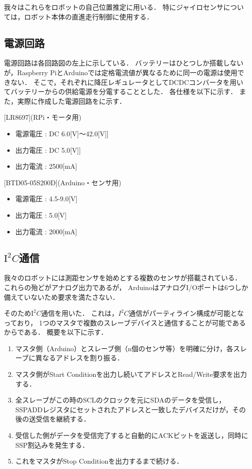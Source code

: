 \documentclass[11pt,a4]{jsarticle}
\begin{document}
      我々はこれらをロボットの自己位置推定に用いる．
      特にジャイロセンサについては，ロボット本体の直進走行制御に使用する．


  \subsection{電源回路}
    電源回路は各回路図の左上に示している．
    バッテリーはひとつしか搭載しないが，Raspberry PiとArduinoでは定格電流値が異なるために同一の電源は使用できない．
    そこで，それぞれに降圧レギュレータとしてDCDCコンバータを用いてバッテリーからの供給電源を分電することとした．
    各仕様を以下に示す．
    また，実際に作成した電源回路をに示す．

    [LR8697](RPi・モータ用)
    \begin{itemize}
     \item 電源電圧 : DC 6.0[V]$〜$42.0[V]]
     \item 出力電圧 : DC 5.0[V]]
     \item 出力電流 : 2500[mA]
    \end{itemize}

    [BTD05-05S200D](Arduino・センサ用)
    \begin{itemize}
     \item 電源電圧 : 4.5-9.0[V]
     \item 出力電圧 : 5.0[V]
     \item 出力電流 : 2000[mA]
    \end{itemize}


  \subsection{$\mathrm{I^2}C$通信}
    我々のロボットには測距センサを始めとする複数のセンサが搭載されている．
    これらの殆どがアナログ出力であるが，
    ArduinoはアナログI/Oポートは6つしか備えていないため要求を満たさない．

    そのため$\mathrm{I^2}C$通信を用いた．
    これは，$I^2 C$通信がパーティライン構成が可能となっており，
    1つのマスタで複数のスレーブデバイスと通信することが可能であるからである．
    概要を以下に示す．
    \begin{enumerate}
      \item マスタ側（Arduino）とスレーブ側（n個のセンサ等）を明確に分け，各スレーブに異なるアドレスを割り振る．
      \item マスタ側がStart Conditionを出力し続いてアドレスとRead/Write要求を出力する．
      \item 全スレーブがこの時のSCLのクロックを元にSDAのデータを受信し，SSPADDレジスタにセットされたアドレスと一致したデバイスだけが，その後の送受信を継続する．
      \item 受信した側がデータを受信完了すると自動的にACKビットを返送し，同時にSSP割込みを発生する．
      \item これをマスタがStop Conditionを出力するまで続ける．
    \end{enumerate}
\end{document}
